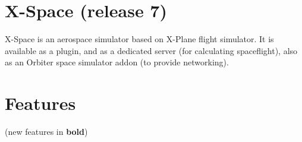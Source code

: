 \documentclass{article}
\begin{document}
\pagestyle{plain} %


\section{X-Space (release 7)}

X-Space is an aerospace simulator based on X-Plane flight simulator. It is available as a plugin, and as a dedicated server (for calculating spaceflight), also as an Orbiter space simulator addon (to provide networking).

\section{Features}
(new features in \textbf{bold})
\end{document}
